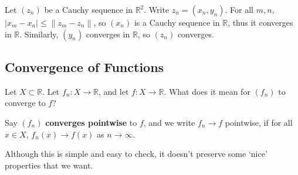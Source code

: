 \documentclass[12pt]{article}
\begin{document}
\begin{proofbox}
	Let $(z_n)$ be a Cauchy sequence in $\mathbb{R}^2$. Write $z_n = (x_n, y_n)$. For all $m, n$, $|x_m - x_n| \leq \|z_m - z_n\|$, so $(x_n)$ is a Cauchy sequence in $\mathbb{R}$, thus it converges in $\mathbb{R}$. Similarly, $(y_n)$ converges in $\mathbb{R}$, so $(z_n)$ converges.
\end{proofbox}

\subsection{Convergence of Functions}%
\label{sub:convergence_of_functions}

Let $X \subset \mathbb{R}$. Let $f_n : X \to \mathbb{R}$, and let $f : X \to \mathbb{R}$. What does it mean for $(f_n)$ to converge to $f$?

\begin{definition}
	Say $(f_n)$ \textbf{converges pointwise} to $f$, and we write $f_n \to f$ pointwise, if for all $x \in X$, $f_n(x) \to f(x)$ as $n \to \infty$.
\end{definition}

Although this is simple and easy to check, it doesn't preserve some `nice' properties that we want.
\end{document}
